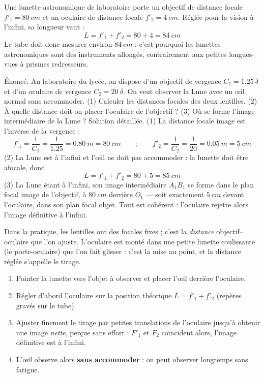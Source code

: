 \documentclass[11pt]{article}
\newcommand{\cle}[1]{{\popxbold\color{popdark}#1}}
\newcounter{popsec}
\newcounter{popsub}
\newcommand{\courssub}[1]{%
  \stepcounter{popsub}%
  \par\vspace{9pt}\noindent{\popxbold\fontsize{11.5}{13}\selectfont\color{popink}{\color{poporange}\thepopsec.\thepopsub}\hspace{6pt}#1}\par\nopagebreak\vspace{4pt}
}
\begin{document}
\begin{exemplebox}
Une lunette astronomique de laboratoire porte un objectif de distance focale $f'_1 = \SI{80}{cm}$ et un oculaire de distance focale $f'_2 = \SI{4}{cm}$. Réglée pour la vision à l'infini, sa longueur vaut :
\[
L = f'_1 + f'_2 = 80 + 4 = \SI{84}{cm}
\]
Le tube doit donc mesurer environ $\SI{84}{cm}$ : c'est pourquoi les lunettes astronomiques sont des instruments allongés, contrairement aux petites longues-vues à prismes redresseurs.
\end{exemplebox}

\begin{exoresolu}
Énoncé. Au laboratoire du lycée, on dispose d'un objectif de vergence $C_1 = \num{1,25}\ \delta$ et d'un oculaire de vergence $C_2 = \num{20}\ \delta$. On veut observer la Lune avec un œil normal sans accommoder. (1) Calculer les distances focales des deux lentilles. (2) À quelle distance doit-on placer l'oculaire de l'objectif ? (3) Où se forme l'image intermédiaire de la Lune ?
\tcblower
Solution détaillée.
(1) La distance focale image est l'inverse de la vergence :
\[
f'_1 = \frac{1}{C_1} = \frac{1}{\num{1,25}} = \SI{0,80}{m} = \SI{80}{cm} \qquad ; \qquad f'_2 = \frac{1}{C_2} = \frac{1}{20} = \SI{0,05}{m} = \SI{5}{cm}
\]
(2) La Lune est à l'infini et l'œil ne doit pas accommoder : la lunette doit être afocale, donc
\[
L = f'_1 + f'_2 = 80 + 5 = \SI{85}{cm}
\]
(3) La Lune étant à l'infini, son image intermédiaire $A_1B_1$ se forme dans le plan focal image de l'objectif, à $\SI{80}{cm}$ derrière $O_1$ — soit exactement $\SI{5}{cm}$ devant l'oculaire, dans son plan focal objet. Tout est cohérent : l'oculaire rejette alors l'image définitive à l'infini.
\end{exoresolu}

\courssub{La mise au point : régler le tirage}

Dans la pratique, les lentilles ont des focales fixes ; c'est la \emph{distance} objectif–oculaire que l'on ajuste. L'oculaire est monté dans une petite lunette coulissante (le \cle{porte-oculaire}) que l'on fait glisser : c'est la \cle{mise au point}, et la distance réglée s'appelle le \cle{tirage}.

\begin{methode}
\begin{enumerate}
\item Pointer la lunette vers l'objet à observer et placer l'œil derrière l'oculaire.
\item Régler d'abord l'oculaire sur la position théorique $L = f'_1 + f'_2$ (repères gravés sur le tube).
\item Ajuster finement le tirage par petites translations de l'oculaire jusqu'à obtenir une image \emph{nette}, perçue sans effort : $F'_1$ et $F_2$ coïncident alors, l'image définitive est à l'infini.
\item L'œil observe alors \textbf{sans accommoder} : on peut observer longtemps sans fatigue.
\end{enumerate}
\end{methode}
\end{document}

